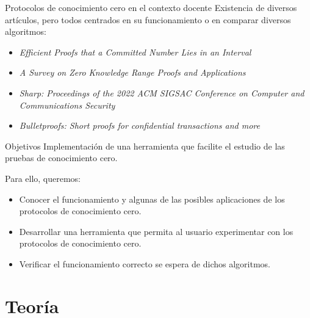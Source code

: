 \documentclass[8pt,xcolor=dvipsnames]{beamer}
\begin{document}

\begin{frame}[fragile]{Protocolos de conocimiento cero en el contexto docente}
    Existencia de diversos artículos, pero todos centrados en su funcionamiento o en comparar diversos algoritmos:
    \begin{itemize}
        \item \textit{Efficient Proofs that a Committed Number Lies in an Interval} \cite{Boudot}
        \item \textit{A Survey on Zero Knowledge Range Proofs and Applications} \cite{Survey}
        \item \textit{Sharp: Proceedings of the 2022 ACM SIGSAC Conference on Computer and Communications Security} \cite{Sharp}
        \item \textit{Bulletproofs: Short proofs for confidential transactions and more} \cite{Bulletproofs}
    \end{itemize}
\end{frame}


\begin{frame}[fragile]{Objetivos}
    Implementación de una herramienta que facilite el estudio de las pruebas de conocimiento cero.
    
    Para ello, queremos:
    \begin{itemize}
        \item Conocer el funcionamiento y algunas de las posibles aplicaciones de los protocolos de conocimiento cero.
        \item Desarrollar una herramienta que permita al usuario experimentar con los protocolos de conocimiento cero.
        \item Verificar el funcionamiento correcto se espera de dichos algoritmos.
    \end{itemize}
\end{frame}


\section{Teoría}
\end{document}
